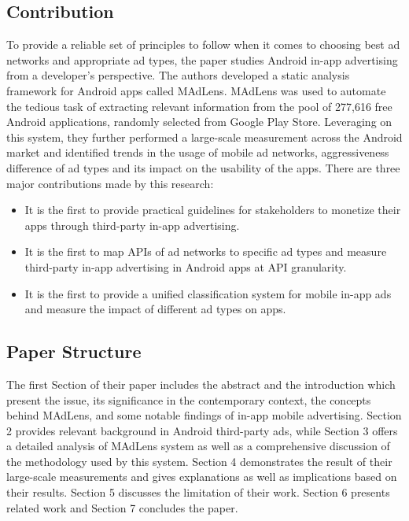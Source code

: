 \documentclass[conference]{IEEEtran}
\begin{document}
\subsection{Contribution}
To provide a reliable set of principles to follow when it comes to choosing best ad networks and appropriate ad types, the paper studies Android in-app advertising from a developer’s perspective. The authors developed a static analysis framework for Android apps called MAdLens. MAdLens was used to automate the tedious task of extracting relevant information from the pool of 277,616 free Android applications, randomly selected from Google Play Store. Leveraging on this system, they further performed a large-scale measurement across the Android market and identified trends in the usage of mobile ad networks, aggressiveness difference of ad types and its impact on the usability of the apps. There are three major contributions made by this research:
\begin{itemize}
\item It is the first to provide practical guidelines for stakeholders to monetize their apps through third-party in-app advertising.
\item It is the first to map APIs of ad networks to specific ad types and measure third-party in-app advertising in Android apps at API granularity.
\item It is the first to provide a unified classification system for mobile in-app ads and measure the impact of different ad types on apps.
\end{itemize}

\subsection{Paper Structure}
The first Section of their paper includes the abstract and the introduction which present the issue, its significance in the contemporary context, the concepts behind MAdLens, and some notable findings of in-app mobile advertising. Section 2 provides relevant background in Android third-party ads, while Section 3 offers a detailed analysis of MAdLens system as well as a comprehensive discussion of the methodology used by this system. Section 4 demonstrates the result of their large-scale measurements and gives explanations as well as implications based on their results. Section 5 discusses the limitation of their work. Section 6 presents related work and Section 7 concludes the paper.
\end{document}
